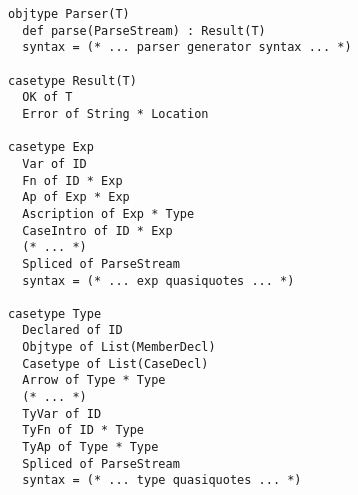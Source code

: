 \begin{figure}[t!]
\begin{lstlisting}[style=wyvern]
objtype Parser(T)
  def parse(ParseStream) : Result(T)
  syntax = (* ... parser generator syntax ... *)

casetype Result(T)
  OK of T
  Error of String * Location

casetype Exp
  Var of ID
  Fn of ID * Exp
  Ap of Exp * Exp
  Ascription of Exp * Type
  CaseIntro of ID * Exp
  (* ... *)
  Spliced of ParseStream 
  syntax = (* ... exp quasiquotes ... *)

casetype Type
  Declared of ID
  Objtype of List(MemberDecl)
  Casetype of List(CaseDecl)
  Arrow of Type * Type
  (* ... *)
  TyVar of ID 
  TyFn of ID * Type
  TyAp of Type * Type
  Spliced of ParseStream 
  syntax = (* ... type quasiquotes ... *)
\end{lstlisting}
\label{exp-prelude}
\end{figure}